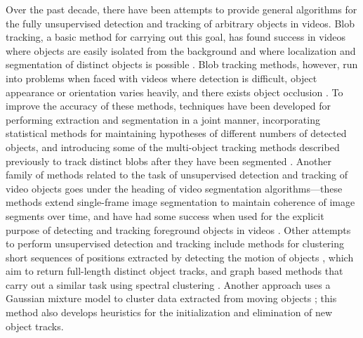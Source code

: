 \documentclass[twocolumn, final]{svjour3}
\begin{document}
Over the past decade, there have been attempts to provide general algorithms for the fully unsupervised detection and tracking of arbitrary objects in videos. Blob tracking, a basic method for carrying out this goal, has found success in videos where objects are easily isolated from the background and where localization and segmentation of distinct objects is possible \cite{francois2004real, isard_2001}. Blob tracking methods, however, run into problems when faced with videos where detection is difficult, object appearance or orientation varies heavily, and there exists object occlusion \cite{song2005model}. To improve the accuracy of these methods, techniques have been developed for performing extraction and segmentation in a joint manner, incorporating statistical methods for maintaining hypotheses of different numbers of detected objects, and introducing some of the multi-object tracking methods described previously to track distinct blobs after they have been segmented \cite{collins2003mean, isard_2001}. Another family of methods related to the task of unsupervised detection and tracking of video objects goes under the heading of video segmentation algorithms---these methods extend single-frame image segmentation to maintain coherence of image segments over time, and have had some success when used for the explicit purpose of detecting and tracking foreground objects in videos \cite{brox2003unsupervised, sista2000unsupervised, wang1998unsupervised}. Other attempts to perform unsupervised detection and tracking include methods for clustering short sequences of positions extracted by detecting the motion of objects \cite{brostow2006unsupervised, brox2010object}, which aim to return full-length distinct object tracks, and graph based methods that carry out a similar task using spectral clustering \cite{fragkiadaki2011detection}. Another approach uses a Gaussian mixture model to cluster data extracted from moving objects \cite{pece_2002}; this method also develops heuristics for the initialization and elimination of new object tracks. 
\end{document}
